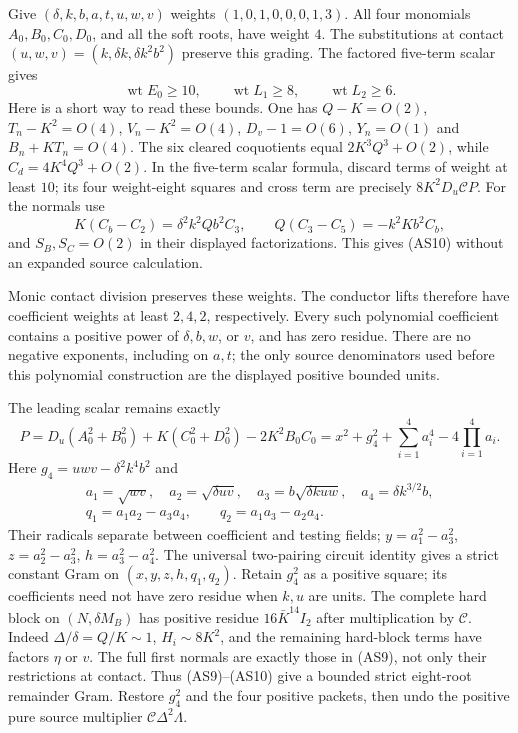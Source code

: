 Give $(\delta,k,b,a,t,u,w,v)$ weights $(1,0,1,0,0,0,1,3)$.
All four monomials $A_0,B_0,C_0,D_0$, and all the soft roots, have
weight $4$. The substitutions at contact
$(u,w,v)=(k,\delta k,\delta k^2b^2)$ preserve this grading.
The factored five-term scalar gives
\[
 \operatorname{wt}E_0\ge10,\qquad
 \operatorname{wt}L_1\ge8,\qquad
 \operatorname{wt}L_2\ge6.\tag{AS10}
\]
Here is a short way to read these bounds. One has
$Q-K=O(2)$, $T_n-K^2=O(4)$, $V_n-K^2=O(4)$,
$D_v-1=O(6)$, $Y_n=O(1)$ and $B_n+KT_n=O(4)$.
The six cleared coquotients equal $2K^3Q^3+O(2)$, while
$C_d=4K^4Q^3+O(2)$. In the five-term scalar formula, discard terms
of weight at least $10$; its four weight-eight squares and cross term
are precisely $8K^2D_u\mathcal C P$. For the normals use
\[
 K(C_b-C_2)=\delta^2k^2Qb^2C_3,
 \qquad Q(C_3-C_5)=-k^2Kb^2C_b,
\]
and $S_B,S_C=O(2)$ in their displayed factorizations. This gives
(AS10) without an expanded source calculation.

Monic contact division preserves these weights. The conductor lifts
therefore have coefficient weights at least $2,4,2$, respectively.
Every such polynomial coefficient contains a positive power of
$\delta,b,w$, or $v$, and has zero residue. There are no negative
exponents, including on $a,t$; the only source denominators used before
this polynomial construction are the displayed positive bounded units.

The leading scalar remains exactly
\[
 P=D_u(A_0^2+B_0^2)+K(C_0^2+D_0^2)-2K^2B_0C_0
   =x^2+g_4^2+\sum_{i=1}^4a_i^4-4\prod_{i=1}^4a_i.
\]
Here $g_4=uwv-\delta^2k^4b^2$ and
\[
 \begin{gathered}
 a_1=\sqrt{wv},\quad a_2=\sqrt{\delta uv},\quad
 a_3=b\sqrt{\delta kuw},\quad a_4=\delta k^{3/2}b,
 \\
 q_1=a_1a_2-a_3a_4,\qquad q_2=a_1a_3-a_2a_4.
 \end{gathered}
\]
Their radicals separate between coefficient and testing fields;
$y=a_1^2-a_3^2$, $z=a_2^2-a_3^2$, $h=a_3^2-a_4^2$.
The universal two-pairing circuit identity gives a strict constant Gram
on $(x,y,z,h,q_1,q_2)$. Retain $g_4^2$ as a positive square; its
coefficients need not have zero residue when $k,u$ are units.
The complete hard block on $(N,\delta M_B)$ has positive residue
$16\bar K^{14}I_2$ after multiplication by $\mathcal C$.
Indeed $\Delta/\delta=Q/K\sim1$, $H_i\sim8K^2$, and the remaining
hard-block terms have factors $\eta$ or $v$. The full first normals
are exactly those in (AS9), not only their restrictions at contact.
Thus (AS9)--(AS10) give a bounded strict eight-root remainder Gram.
Restore $g_4^2$ and the four positive packets, then undo the positive
pure source multiplier $\mathcal C\Delta^2\Lambda$.

